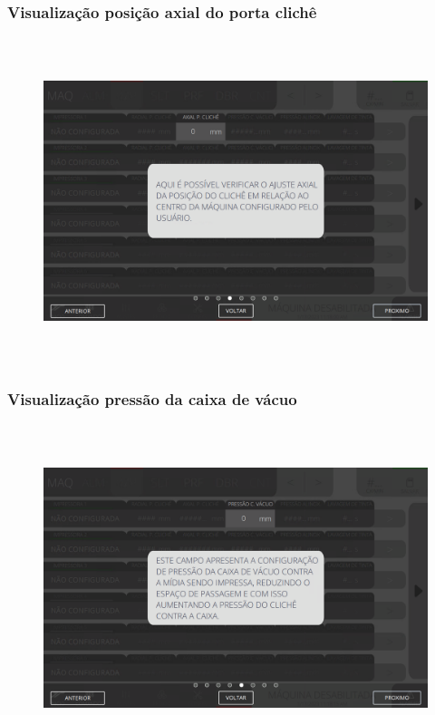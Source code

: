 \newpage
\thispagestyle{fancy}
\vspace*{\fill}
\subsubsection{\small{Visualização posição axial do porta clichê}}
\begin{figure}[h]
  \centering
  \includegraphics[width=576px,height=360px]{src/imagesFlexo/04-printter/01-printters/settings/e-4.png}
\end{figure}
\vspace*{\fill}

\newpage
\thispagestyle{fancy}
\vspace*{\fill}
\subsubsection{\small{Visualização pressão da caixa de vácuo}}
\begin{figure}[h]
  \centering
  \includegraphics[width=576px,height=360px]{src/imagesFlexo/04-printter/01-printters/settings/e-5.png}
\end{figure}
\vspace*{\fill}

